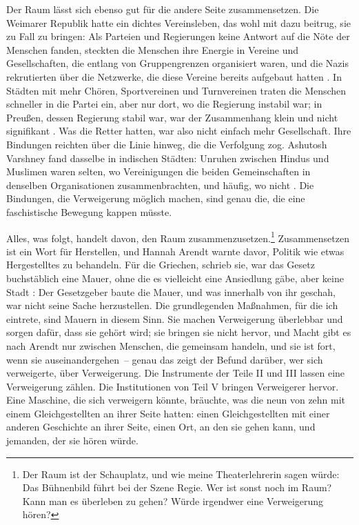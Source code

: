 Der Raum lässt sich ebenso gut für die andere Seite zusammensetzen. Die Weimarer Republik hatte ein dichtes Vereinsleben, das wohl mit dazu beitrug, sie zu Fall zu bringen: Als Parteien und Regierungen keine Antwort auf die Nöte der Menschen fanden, steckten die Menschen ihre Energie in Vereine und Gesellschaften, die entlang von Gruppengrenzen organisiert waren, und die Nazis rekrutierten über die Netzwerke, die diese Vereine bereits aufgebaut hatten \autocite{berman1997weimar}. In Städten mit mehr Chören, Sportvereinen und Turnvereinen traten die Menschen schneller in die Partei ein, aber nur dort, wo die Regierung instabil war; in Preußen, dessen Regierung stabil war, war der Zusammenhang klein und nicht signifikant \autocite{satyanath2017bowling}. Was die Retter hatten, war also nicht einfach mehr Gesellschaft. Ihre Bindungen reichten über die Linie hinweg, die die Verfolgung zog. Ashutosh Varshney fand dasselbe in indischen Städten: Unruhen zwischen Hindus und Muslimen waren selten, wo Vereinigungen die beiden Gemeinschaften in denselben Organisationen zusammenbrachten, und häufig, wo nicht \autocite{varshney2002ethnic}. Die Bindungen, die Verweigerung möglich machen, sind genau die, die eine faschistische Bewegung kappen müsste.

Alles, was folgt, handelt davon, den Raum zusammenzusetzen.\footnote{Der Raum ist der Schauplatz, und wie meine Theaterlehrerin sagen würde: Das Bühnenbild führt bei der Szene Regie. Wer ist sonst noch im Raum? Kann man es überleben zu gehen? Würde irgendwer eine Verweigerung hören?} Zusammensetzen ist ein Wort für Herstellen, und Hannah Arendt warnte davor, Politik wie etwas Hergestelltes zu behandeln. Für die Griechen, schrieb sie, war das Gesetz buchstäblich eine Mauer, ohne die es vielleicht eine Ansiedlung gäbe, aber keine Stadt \autocite{arendt1958human}: Der Gesetzgeber baute die Mauer, und was innerhalb von ihr geschah, war nicht seine Sache herzustellen. Die grundlegenden Maßnahmen, für die ich eintrete, sind Mauern in diesem Sinn. Sie machen Verweigerung überlebbar und sorgen dafür, dass sie gehört wird; sie bringen sie nicht hervor, und Macht gibt es nach Arendt nur zwischen Menschen, die gemeinsam handeln, und sie ist fort, wenn sie auseinandergehen~– genau das zeigt der Befund darüber, wer sich verweigerte, über Verweigerung. Die Instrumente der Teile II und III lassen eine Verweigerung zählen. Die Institutionen von Teil V bringen Verweigerer hervor. Eine Maschine, die sich verweigern könnte, bräuchte, was die neun von zehn mit einem Gleichgestellten an ihrer Seite hatten: einen Gleichgestellten mit einer anderen Geschichte an ihrer Seite, einen Ort, an den sie gehen kann, und jemanden, der sie hören würde.

